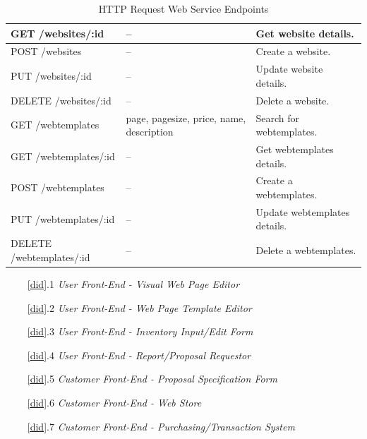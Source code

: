 \documentclass{article}
\newcommand{\br}{\vspace{2mm}}
\begin{document}
\begin{table}[H]
\begin{tabular}{|l|p{4.5cm}|l|}
         GET /websites/:id & -- & Get website details. \\\hline
         POST /websites & -- & Create a website. \\\hline
         PUT /websites/:id & -- & Update website details. \\\hline
         DELETE /websites/:id & -- & Delete a website. \\\hline
         GET /webtemplates & page, pagesize, price, name, description & Search for webtemplates. \\\hline
         GET /webtemplates/:id & -- & Get webtemplates details. \\\hline
         POST /webtemplates & -- & Create a webtemplates. \\\hline
         PUT /webtemplates/:id & -- & Update webtemplates details. \\\hline
         DELETE /webtemplates/:id & -- & Delete a webtemplates. \\\hline
    \end{tabular}
    \caption{HTTP Request Web Service Endpoints}
    \label{endpoints}
\end{table}

\begin{enumerate}
    \item[~\ref{did}.1 ] \emph{User Front-End - Visual Web Page Editor}\br\\
    \item[~\ref{did}.2 ] \emph{User Front-End - Web Page Template Editor}\br\\
    \item[~\ref{did}.3 ] \emph{User Front-End - Inventory Input/Edit Form}\br\\
    \item[~\ref{did}.4 ] \emph{User Front-End - Report/Proposal Requestor}\br\\
    \item[~\ref{did}.5 ] \emph{Customer Front-End - Proposal Specification Form}\br\\
    \item[~\ref{did}.6 ] \emph{Customer Front-End - Web Store}\br\\
    \item[~\ref{did}.7 ] \emph{Customer Front-End - Purchasing/Transaction System}\br\\
\end{enumerate}


\end{document}
